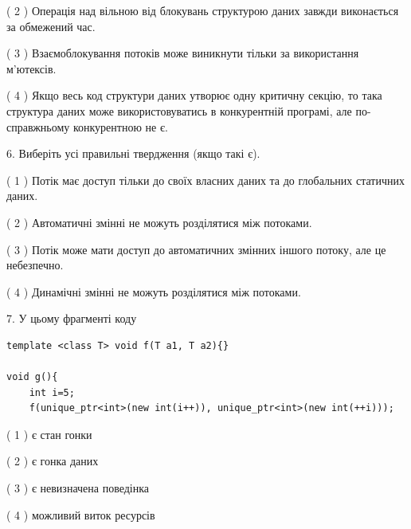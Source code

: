 \documentclass[12pt, ukrainian]{article}
\begin{document}
\begin {large}
{( 2 ) Операція над вільною від блокувань структурою даних завжди виконається за обмежений час.%

( 3 ) Взаємоблокування потоків може виникнути тільки за використання м’ютексів.%

( 4 ) Якщо весь код структури даних утворює одну критичну секцію, то така структура даних може використовуватись в конкурентній програмі, але по-справжньо\-му конкурентною не є.%
\newpage



\vspace{5mm}
6. Виберіть усі правильні твердження (якщо такі є).\par
\vspace{2mm}

( 1 ) Потік має доступ тільки до своїх власних даних та до глобальних статичних даних.%

( 2 ) Автоматичні змінні не можуть розділятися між потоками.%

( 3 ) Потік може мати доступ до автоматичних змінних іншого потоку, але це небезпечно.%

( 4 ) Динамічні змінні не можуть розділятися між потоками.%


\vspace{5mm}
7. У цьому фрагменті коду
\begin{verbatim}
template <class T> void f(T a1, T a2){}

void g(){
    int i=5;
    f(unique_ptr<int>(new int(i++)), unique_ptr<int>(new int(++i)));
\end{verbatim}

( 1 ) є стан гонки%

( 2 ) є гонка даних%

( 3 ) є невизначена поведінка%

( 4 ) можливий виток ресурсів%
}
\end {large}
\end{document}
